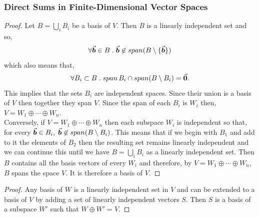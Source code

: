 \documentclass[MathsNotesBase.tex]{subfiles}
\begin{document}
{	\bigskip
	\subsubsection{Direct Sums in Finite-Dimensional Vector Spaces}
	\medskip
	\begin{proof}
		Let ${ B = \bigcup_i B_i }$ be a basis of $V$. Then $B$ is a linearly independent set and so,
		\[ \forall \vec{\bm{b}} \in B \;.\; \vec{\bm{b}} \not\in span(B \setminus \{\vec{\bm{b}}\}) \]
		which also means that,
		\[ \forall B_i \subset B \;.\; span\,B_i \cap span(B \setminus B_i) = \vec{\bm{0}}. \]
		This implies that the sets $B_i$ are independent spaces. Since their union is a basis of $V$ then together they span $V$. Since the span of each $B_i$ is $W_i$ then, ${ V = W_1 \oplus \cdots \oplus W_n }$.\\
		Conversely, if ${ V = W_1 \oplus \cdots \oplus W_n }$ then each subspace $W_i$ is independent so that, for every ${ \vec{\bm{b}} \in B_i,\; \vec{\bm{b}} \not\in span(B \setminus B_i) }$. This means that if we begin with $B_1$ and add to it the elements of $B_2$ then the resulting set remains linearly independent and we can continue this until we have ${ B = \bigcup_i B_i }$ as a linearly independent set. Then $B$ contains all the basis vectors of every $W_i$ and therefore, by ${ V = W_1 \oplus \cdots \oplus W_n }$, $B$ spans the space $V$. It is therefore a basis of $V$.
	\end{proof}

	\medskip
	\begin{proof}
		Any basis of $W$ is a linearly independent set in $V$ and can be extended to a basis of $V$ by adding a set of linearly independent vectors $S$. Then $S$ is a basis of a subspace $W'$ such that ${ W \oplus W' = V }$.
	\end{proof}
}




\end{document}
